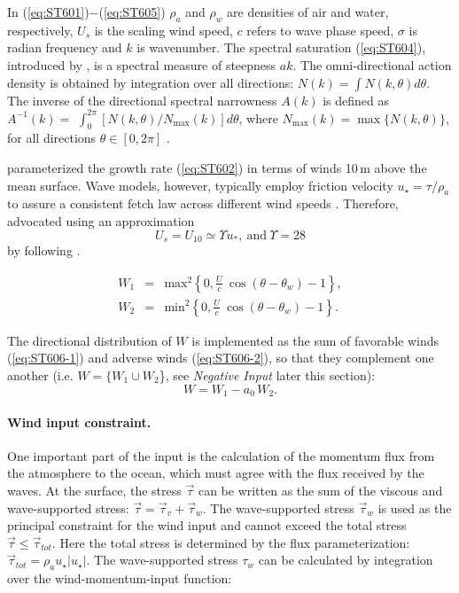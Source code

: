 \noindent
In (\ref{eq:ST601})$-$(\ref{eq:ST605}) $\rho_a$ and $\rho_w$ are densities
of air and water, respectively, $U_s$ is the scaling wind speed, $c$ refers to
wave phase speed, $\sigma$ is radian frequency and $k$
is wavenumber. The spectral saturation (\ref{eq:ST604}), introduced
by \citet{art:Phi84}, is a spectral measure of steepness $ak$.  The
omni-directional action density is obtained by integration over all directions:
$N(k)=\int N(k,\theta)d\theta$.\linebreak
The inverse of the directional spectral narrowness $A(k)$ is defined as\linebreak
$A^{-1}(k) =$ $\int_{0}^{2\pi} [{N(k,\theta)}/{N_{\max}(k)}] d\theta$,
where $N_{\max}(k)=\max\bigl \{N(k,\theta)\bigr \}$, for all
directions $\theta\in[0,2\pi]$ \citep{art:BS87}.

\citet{art:Dea06} parameterized the growth rate (\ref{eq:ST602}) in terms
of winds 10\,m above the mean surface. Wave models, however, typically employ friction
velocity $u_\star=\tau/\rho_a$ to assure a consistent fetch law across
different wind speeds \citep[][p. 253]{bk:WAM94}. Therefore, \citet{art:RBW12}
advocated using an approximation
\begin{equation}
U_s = U_{10} \simeq \Upsilon u_{\ast},\ \mathrm{and}\ \Upsilon = 28
\label{eq:Upsilon}
\end{equation}
by following \citet{art:KHH84}.

\begin{eqnarray}
W_1 & = & \mathrm{max}^2 \left \{ 0,\frac{U}{c}\ \cos(\theta-\theta_w)-1
\right \}  , \label{eq:ST606-1} \\
W_2 & = & \mathrm{min}^2 \left \{ 0,\frac{U}{c}\ \cos(\theta-\theta_w)-1
\right \} .\label{eq:ST606-2}
\end{eqnarray}

\noindent
The directional distribution of $W$ is implemented as the sum of favorable
winds (\ref{eq:ST606-1}) and adverse winds (\ref{eq:ST606-2}), so that they
complement one another (i.e. $W=\{W_1\cup W_2$\}, see {\it Negative Input}
later this section):
\begin{equation}\label{eq:ST606}
W=W_1-a_0\,W_2  .
\end{equation}

\paragraph{Wind input constraint.} One important part of the input is the
calculation of the momentum flux from the atmosphere to the ocean,
which must agree with the flux received by the waves. At the surface,
the stress $\vec{\tau}$ can be written as the sum of the viscous and
wave-supported stress: $\vec{\tau} = \vec{\tau}_{v} + \vec{\tau}_{w}$.
The wave-supported stress $ \vec{\tau}_{w}$ is used as the principal
constraint for the wind input and cannot exceed the total stress
$\vec{\tau} \le \vec{\tau}_{tot}$.  Here the total stress is determined
by the flux parameterization: $\vec{\tau}_{tot}=\rho_a u_\star|u_\star|$.
The wave-supported stress $\tau_w$ can be calculated by integration over
the wind-momentum-input function:

